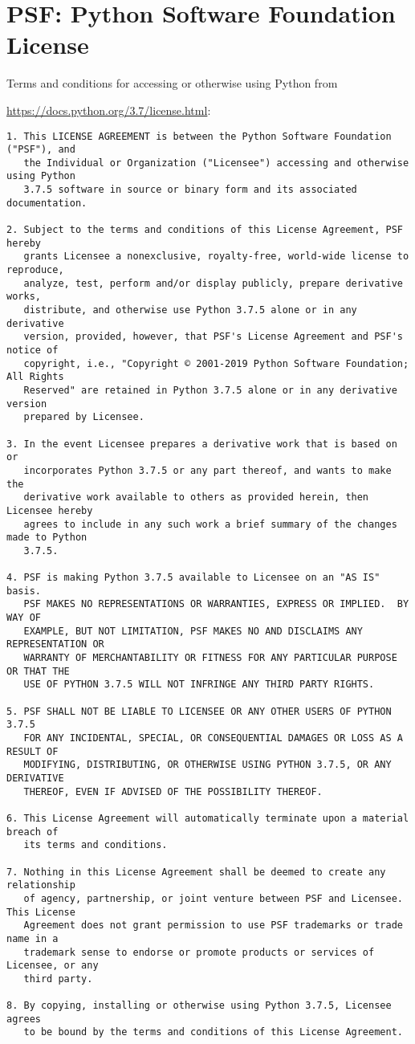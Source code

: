\section{PSF: Python Software Foundation License}

Terms and conditions for accessing or otherwise using Python from


\url{https://docs.python.org/3.7/license.html}:

\scriptsize
\begin{verbatim}
1. This LICENSE AGREEMENT is between the Python Software Foundation ("PSF"), and
   the Individual or Organization ("Licensee") accessing and otherwise using Python
   3.7.5 software in source or binary form and its associated documentation.

2. Subject to the terms and conditions of this License Agreement, PSF hereby
   grants Licensee a nonexclusive, royalty-free, world-wide license to reproduce,
   analyze, test, perform and/or display publicly, prepare derivative works,
   distribute, and otherwise use Python 3.7.5 alone or in any derivative
   version, provided, however, that PSF's License Agreement and PSF's notice of
   copyright, i.e., "Copyright © 2001-2019 Python Software Foundation; All Rights
   Reserved" are retained in Python 3.7.5 alone or in any derivative version
   prepared by Licensee.

3. In the event Licensee prepares a derivative work that is based on or
   incorporates Python 3.7.5 or any part thereof, and wants to make the
   derivative work available to others as provided herein, then Licensee hereby
   agrees to include in any such work a brief summary of the changes made to Python
   3.7.5.

4. PSF is making Python 3.7.5 available to Licensee on an "AS IS" basis.
   PSF MAKES NO REPRESENTATIONS OR WARRANTIES, EXPRESS OR IMPLIED.  BY WAY OF
   EXAMPLE, BUT NOT LIMITATION, PSF MAKES NO AND DISCLAIMS ANY REPRESENTATION OR
   WARRANTY OF MERCHANTABILITY OR FITNESS FOR ANY PARTICULAR PURPOSE OR THAT THE
   USE OF PYTHON 3.7.5 WILL NOT INFRINGE ANY THIRD PARTY RIGHTS.

5. PSF SHALL NOT BE LIABLE TO LICENSEE OR ANY OTHER USERS OF PYTHON 3.7.5
   FOR ANY INCIDENTAL, SPECIAL, OR CONSEQUENTIAL DAMAGES OR LOSS AS A RESULT OF
   MODIFYING, DISTRIBUTING, OR OTHERWISE USING PYTHON 3.7.5, OR ANY DERIVATIVE
   THEREOF, EVEN IF ADVISED OF THE POSSIBILITY THEREOF.

6. This License Agreement will automatically terminate upon a material breach of
   its terms and conditions.

7. Nothing in this License Agreement shall be deemed to create any relationship
   of agency, partnership, or joint venture between PSF and Licensee.  This License
   Agreement does not grant permission to use PSF trademarks or trade name in a
   trademark sense to endorse or promote products or services of Licensee, or any
   third party.

8. By copying, installing or otherwise using Python 3.7.5, Licensee agrees
   to be bound by the terms and conditions of this License Agreement.
\end{verbatim}
\normalsize

\label{lastpagea}
